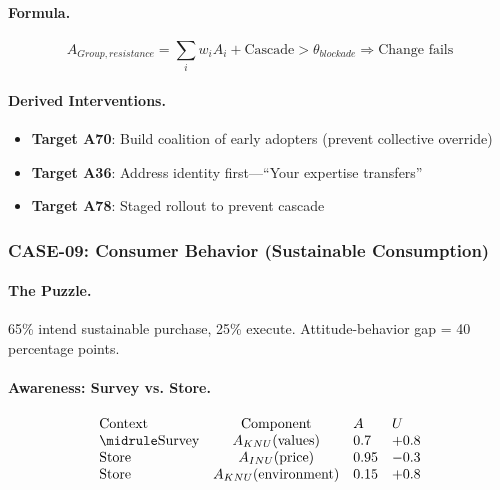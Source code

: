 \paragraph{Formula.}
\begin{equation}
A_{Group,resistance} = \sum_i w_i A_i + \text{Cascade} > \theta_{blockade} \Rightarrow \text{Change fails}
\end{equation}

\paragraph{Derived Interventions.}
\begin{itemize}
    \item \textbf{Target A70}: Build coalition of early adopters (prevent collective override)
    \item \textbf{Target A36}: Address identity first---``Your expertise transfers''
    \item \textbf{Target A78}: Staged rollout to prevent cascade
\end{itemize}


\subsubsection{CASE-09: Consumer Behavior (Sustainable Consumption)}

\paragraph{The Puzzle.}
65\% intend sustainable purchase, 25\% execute. Attitude-behavior gap = 40 percentage points.

\paragraph{Awareness: Survey vs. Store.}

\begin{equation}
\begin{array}{lcll}
\text{Context} & \text{Component} & A & U \\
\midrule
\text{Survey} & A_{KNU}(\text{values}) & 0.7 & +0.8 \\
\text{Store} & A_{INU}(\text{price}) & 0.95 & -0.3 \\
\text{Store} & A_{KNU}(\text{environment}) & 0.15 & +0.8
\end{array}
\end{equation}

